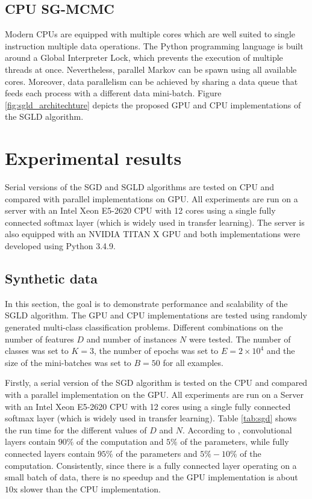 \documentclass[conference]{IEEEtran}
\begin{document}
 
\subsection{CPU SG-MCMC}
Modern CPUs are equipped with multiple cores which are well suited to single instruction multiple data operations. The Python programming language is built around a Global Interpreter Lock, which prevents the execution of multiple threads at once.  Nevertheless, parallel Markov can be spawn using all available cores.  Moreover, data parallelism can be achieved by sharing a data queue that feeds each process with a different data mini-batch.  Figure \ref{fig:sgld_architechture} depicts the proposed GPU and CPU implementations of the SGLD algorithm. 


\section{Experimental results}
Serial versions of the SGD and SGLD algorithms are tested on CPU and compared with parallel
implementations on GPU. All experiments are run on a server with an Intel Xeon E5-2620 CPU
with 12 cores using a single fully connected softmax layer (which is widely used in transfer learning).
The server is also equipped with an NVIDIA TITAN X GPU and both implementations were developed
using Python 3.4.9.

\subsection{Synthetic data}
In this section, the goal is to demonstrate performance and scalability of the SGLD algorithm. The GPU and CPU implementations are tested using randomly generated multi-class classification problems. Different combinations on the number of features $D$ and number of instances $N$ were tested. The number of classes was set to $K=3$, the number of epochs was set to $E=2 \times 10^4$ and the size of the mini-batches was set to $B=50$ for all examples.

Firstly, a serial version  of the SGD algorithm is tested on the CPU and compared with a parallel implementation on the GPU. All experiments are run on a Server with an Intel Xeon E5-2620 CPU with 12 cores using a single fully connected softmax layer (which is widely used in transfer learning). Table \ref{tab:sgd} shows the run time for the different values of $D$ and $N$. According to \cite{LI201695}, convolutional layers contain $90\%$ of the computation and $5\%$ of the parameters, while fully connected layers contain $95\%$ of the parameters and $5\%-10\%$ of the computation. Consistently, since there is a fully connected layer operating on a small batch of data, there is no speedup and the GPU implementation is about $10$x slower than the CPU implementation.
\end{document}
